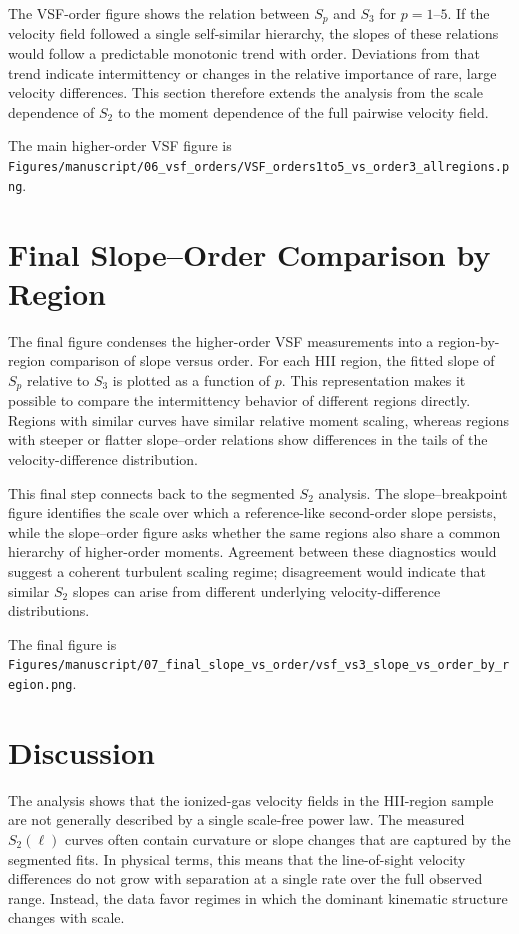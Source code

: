 The VSF-order figure shows the relation between $S_p$ and $S_3$ for
$p=1$--$5$. If the velocity field followed a single self-similar hierarchy, the
slopes of these relations would follow a predictable monotonic trend with
order. Deviations from that trend indicate intermittency or changes in the
relative importance of rare, large velocity differences. This section therefore
extends the analysis from the scale dependence of $S_2$ to the moment
dependence of the full pairwise velocity field.

The main higher-order VSF figure is
\texttt{Figures/manuscript/06\_vsf\_orders/VSF\_orders1to5\_vs\_order3\_allregions.png}.

\section{Final Slope--Order Comparison by Region}
\label{sec:slope-order-final}

The final figure condenses the higher-order VSF measurements into a
region-by-region comparison of slope versus order. For each HII region, the
fitted slope of $S_p$ relative to $S_3$ is plotted as a function of $p$. This
representation makes it possible to compare the intermittency behavior of
different regions directly. Regions with similar curves have similar relative
moment scaling, whereas regions with steeper or flatter slope--order relations
show differences in the tails of the velocity-difference distribution.

This final step connects back to the segmented $S_2$ analysis. The
slope--breakpoint figure identifies the scale over which a reference-like
second-order slope persists, while the slope--order figure asks whether the
same regions also share a common hierarchy of higher-order moments. Agreement
between these diagnostics would suggest a coherent turbulent scaling regime;
disagreement would indicate that similar $S_2$ slopes can arise from different
underlying velocity-difference distributions.

The final figure is
\texttt{Figures/manuscript/07\_final\_slope\_vs\_order/vsf\_vs3\_slope\_vs\_order\_by\_region.png}.

\section{Discussion}
\label{sec:discussion}

The analysis shows that the ionized-gas velocity fields in the HII-region
sample are not generally described by a single scale-free power law. The
measured $S_2(\ell)$ curves often contain curvature or slope changes that are
captured by the segmented fits. In physical terms, this means that the
line-of-sight velocity differences do not grow with separation at a single rate
over the full observed range. Instead, the data favor regimes in which the
dominant kinematic structure changes with scale.

